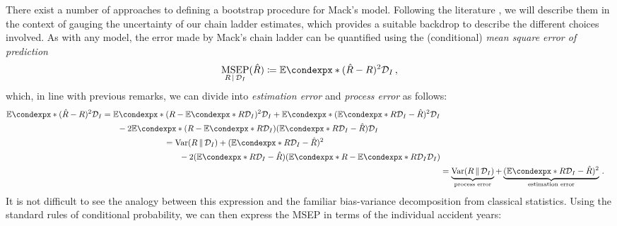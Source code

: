 \documentclass[a4paper]{book}
\theoremstyle{plain}
\newcommand{\condexp}{\mathbb{E}\condexpx}
\begin{document}
There exist a number of approaches to defining a bootstrap procedure for Mack's model. Following the literature , we will describe them in the context of gauging the uncertainty of our chain ladder estimates, which provides a suitable backdrop to describe the different choices involved. As with any model, the error made by Mack's  chain ladder can be quantified using the (conditional) \emph{mean square error of prediction}
\begin{equation}
    \underset{R \, \vert \, \mathcal{D}_I}{\mathrm{MSEP}}(\hat{R}) \coloneqq \condexp*{(\hat{R} - R)^2}{\mathcal{D}_I} \,,
\end{equation}
which, in line with previous remarks, we can divide into \emph{estimation error} and \emph{process error} as follows:
\begin{align}
    \begin{split}
        \condexp*{(\hat{R} - R)^2}{\mathcal{D}_I} &= \condexp*{(R - \condexp*{R}{\mathcal{D}_I})^2}{\mathcal{D}_I} + \condexp*{(\condexp*{R}{\mathcal{D}_I} - \hat{R})^2}{\mathcal{D}_I} \\ &\phantom{{}=1} -2\condexp*{(R - \condexp*{R}{\mathcal{D}_I})(\condexp*{R}{\mathcal{D}_I} - \hat{R})}{\mathcal{D}_I}
    \end{split} \\
    \begin{split}
    &= \mathrm{Var}(R \, \Vert \, \mathcal{D}_I) + (\condexp*{R}{\mathcal{D}_I} - \hat{R})^2 \\
    &\phantom{{}=1} -2(\condexp*{R}{\mathcal{D}_I} - \hat{R})(\condexp*{R - \condexp*{R}{\mathcal{D}_I}}{\mathcal{D}_I})
    \end{split} \\
    &= \underbrace{\mathrm{Var}(R \, \Vert \, \mathcal{D}_I)}_\text{process error} + \underbrace{(\condexp*{R}{\mathcal{D}_I} - \hat{R})^2}_\text{estimation error} \,.
\end{align}
It is not difficult to see the analogy between this expression and the familiar bias-variance decomposition from classical statistics. Using the standard rules of conditional probability, we can then express the MSEP in terms of the individual accident years:
\end{document}
